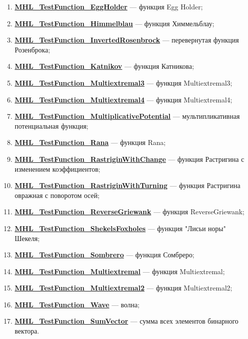 \begin{enumerate}
 \item \hyperref[TestFunctions:section:MHL_TestFunction_EggHolder]{\textbf{MHL\_TestFunction\_EggHolder}} --- функция Egg Holder;
 \item \hyperref[TestFunctions:section:MHL_TestFunction_Himmelblau]{\textbf{MHL\_TestFunction\_Himmelblau}} --- функция Химмельблау;
 \item \hyperref[TestFunctions:section:MHL_TestFunction_InvertedRosenbrock]{\textbf{MHL\_TestFunction\_InvertedRosenbrock}} --- перевернутая функция Розенброка;
 \item \hyperref[TestFunctions:section:MHL_TestFunction_Katnikov]{\textbf{MHL\_TestFunction\_Katnikov}} --- функция Катникова;
 \item \hyperref[TestFunctions:section:MHL_TestFunction_Multiextremal3]{\textbf{MHL\_TestFunction\_Multiextremal3}} --- функция Multiextremal3;
 \item \hyperref[TestFunctions:section:MHL_TestFunction_Multiextremal4]{\textbf{MHL\_TestFunction\_Multiextremal4}} --- функция Multiextremal4;
 \item \hyperref[TestFunctions:section:MHL_TestFunction_MultiplicativePotential]{\textbf{MHL\_TestFunction\_MultiplicativePotential}} --- мультипликативная потенциальная функция;
 \item \hyperref[TestFunctions:section:MHL_TestFunction_Rana]{\textbf{MHL\_TestFunction\_Rana}} --- функция Rana;
 \item \hyperref[TestFunctions:section:MHL_TestFunction_RastriginWithChange]{\textbf{MHL\_TestFunction\_RastriginWithChange}} --- функция Растригина с изменением коэффициентов;
 \item \hyperref[TestFunctions:section:MHL_TestFunction_RastriginWithTurning]{\textbf{MHL\_TestFunction\_RastriginWithTurning}} --- функция Растригина овражная с поворотом осей;
 \item \hyperref[TestFunctions:section:MHL_TestFunction_ReverseGriewank]{\textbf{MHL\_TestFunction\_ReverseGriewank}} --- функция ReverseGriewank;
 \item \hyperref[TestFunctions:section:MHL_TestFunction_ShekelsFoxholes]{\textbf{MHL\_TestFunction\_ShekelsFoxholes}} --- функция "Лисьи норы" Шекеля;
 \item \hyperref[TestFunctions:section:MHL_TestFunction_Sombrero]{\textbf{MHL\_TestFunction\_Sombrero}} --- функция Сомбреро;
 \item \hyperref[TestFunctions:section:MHL_TestFunction_Multiextremal]{\textbf{MHL\_TestFunction\_Multiextremal}} --- функция Multiextremal;
 \item \hyperref[TestFunctions:section:MHL_TestFunction_Multiextremal2]{\textbf{MHL\_TestFunction\_Multiextremal2}} --- функция Multiextremal2;
 \item \hyperref[TestFunctions:section:MHL_TestFunction_Wave]{\textbf{MHL\_TestFunction\_Wave}} --- волна;
 \item \hyperref[TestFunctions:section:MHL_TestFunction_SumVector]{\textbf{MHL\_TestFunction\_SumVector}} --- сумма всех элементов бинарного вектора.
\end{enumerate}

